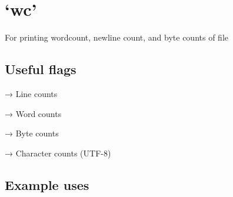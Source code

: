     
    
    

    
    \section{`wc'}\label{wc}

For printing wordcount, newline count, and byte counts of file

    \subsection{Useful flags}\label{useful-flags}

\begin{Shaded}
\begin{Highlighting}[]
 
\end{Highlighting}
\end{Shaded}

→ Line counts

\begin{Shaded}
\begin{Highlighting}[]
 
\end{Highlighting}
\end{Shaded}

→ Word counts

\begin{Shaded}
\begin{Highlighting}[]
 
\end{Highlighting}
\end{Shaded}

→ Byte counts

\begin{Shaded}
\begin{Highlighting}[]
 
\end{Highlighting}
\end{Shaded}

→ Character counts (UTF-8)

    \subsection{Example uses}\label{example-uses}

\begin{Shaded}
\begin{Highlighting}[]
 
\end{Highlighting}
\end{Shaded}

